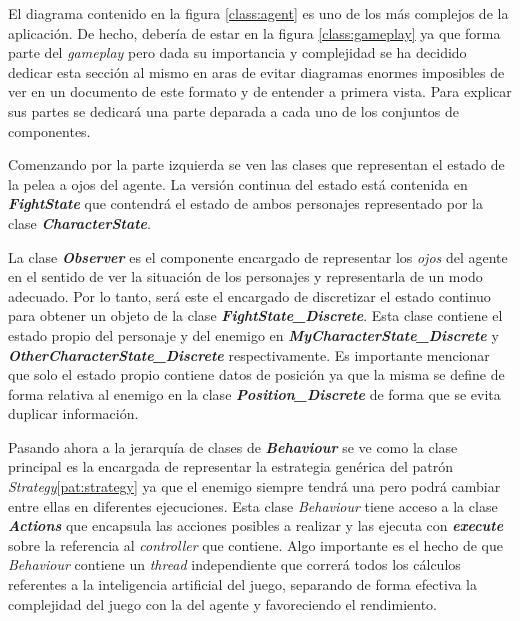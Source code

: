 El diagrama contenido en la figura \ref{class:agent} es uno de los más complejos de la aplicación. De hecho, debería de estar en la figura \ref{class:gameplay} ya que forma parte del \textit{gameplay} pero dada su importancia y complejidad se ha decidido dedicar esta sección al mismo en aras de evitar diagramas enormes imposibles de ver en un documento de este formato y de entender a primera vista. Para explicar sus partes se dedicará una parte deparada a cada uno de los conjuntos de componentes.

\bigskip

Comenzando por la parte izquierda se ven las clases que representan el estado de la pelea a ojos del agente. La versión continua del estado está contenida en \textbf{\textit{FightState}} que contendrá el estado de ambos personajes representado por la clase \textbf{\textit{CharacterState}}.

\bigskip
La clase \textbf{\textit{Observer}} es el componente encargado de representar los \textit{ojos} del agente en el sentido de ver la situación de los personajes y representarla de un modo adecuado. Por lo tanto, será este el encargado de discretizar el estado continuo para obtener un objeto de la clase \textbf{\textit{FightState\_Discrete}}. Esta clase contiene el estado propio del personaje y del enemigo en \textbf{\textit{MyCharacterState\_Discrete}} y \textbf{\textit{OtherCharacterState\_Discrete}} respectivamente. Es importante mencionar que solo el estado propio contiene datos de posición ya que la misma se define de forma relativa al enemigo en la clase \textbf{\textit{Position\_Discrete}} de forma que se evita duplicar información.

\bigskip

Pasando ahora a la jerarquía de clases de \textbf{\textit{Behaviour}} se ve como la clase principal es la encargada de representar la estrategia genérica del patrón \textit{Strategy}\ref{pat:strategy} ya que el enemigo siempre tendrá una pero podrá cambiar entre ellas en diferentes ejecuciones. Esta clase \textit{Behaviour} tiene acceso a la clase \textbf{\textit{Actions}} que encapsula las acciones posibles a realizar y las ejecuta con \textbf{\textit{execute}} sobre la referencia al \textit{controller} que contiene. Algo importante es el hecho de que \textit{Behaviour} contiene un \textit{thread} independiente que correrá todos los cálculos referentes a la inteligencia artificial del juego, separando de forma efectiva la complejidad del juego con la del agente y favoreciendo el rendimiento.

